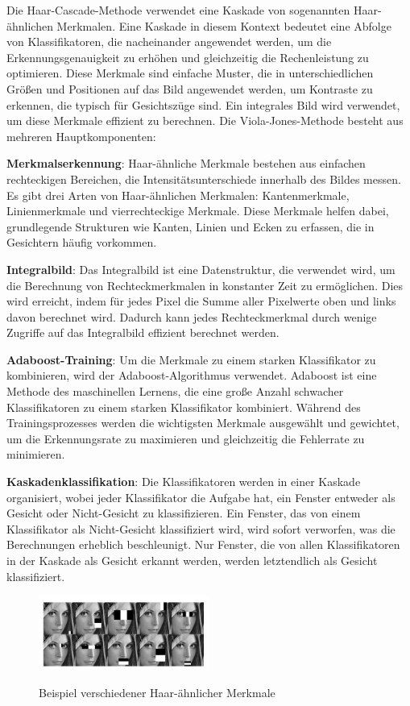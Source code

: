 Die Haar-Cascade-Methode verwendet eine Kaskade von sogenannten Haar-ähnlichen Merkmalen\cite{haar_quelle}. Eine Kaskade in diesem Kontext bedeutet eine Abfolge von Klassifikatoren, die nacheinander angewendet werden, um die Erkennungsgenauigkeit zu erhöhen und gleichzeitig die Rechenleistung zu optimieren. Diese Merkmale sind einfache Muster, die in unterschiedlichen Größen und Positionen auf das Bild angewendet werden, um Kontraste zu erkennen, die typisch für Gesichtszüge sind. Ein integrales Bild wird verwendet, um diese Merkmale effizient zu berechnen. Die Viola-Jones-Methode besteht aus mehreren Hauptkomponenten:

\textbf{Merkmalserkennung}: Haar-ähnliche Merkmale bestehen aus einfachen rechteckigen Bereichen, die Intensitätsunterschiede innerhalb des Bildes messen. Es gibt drei Arten von Haar-ähnlichen Merkmalen: Kantenmerkmale, Linienmerkmale und vierrechteckige Merkmale. Diese Merkmale helfen dabei, grundlegende Strukturen wie Kanten, Linien und Ecken zu erfassen, die in Gesichtern häufig vorkommen.

\textbf{Integralbild}: Das Integralbild ist eine Datenstruktur, die verwendet wird, um die Berechnung von Rechteckmerkmalen in konstanter Zeit zu ermöglichen. Dies wird erreicht, indem für jedes Pixel die Summe aller Pixelwerte oben und links davon berechnet wird. Dadurch kann jedes Rechteckmerkmal durch wenige Zugriffe auf das Integralbild effizient berechnet werden.

\textbf{Adaboost-Training}: Um die Merkmale zu einem starken Klassifikator zu kombinieren, wird der Adaboost-Algorithmus verwendet. Adaboost ist eine Methode des maschinellen Lernens, die eine große Anzahl schwacher Klassifikatoren zu einem starken Klassifikator kombiniert. Während des Trainingsprozesses werden die wichtigsten Merkmale ausgewählt und gewichtet, um die Erkennungsrate zu maximieren und gleichzeitig die Fehlerrate zu minimieren.

\textbf{Kaskadenklassifikation}: Die Klassifikatoren werden in einer Kaskade organisiert, wobei jeder Klassifikator die Aufgabe hat, ein Fenster entweder als Gesicht oder Nicht-Gesicht zu klassifizieren. Ein Fenster, das von einem Klassifikator als Nicht-Gesicht klassifiziert wird, wird sofort verworfen, was die Berechnungen erheblich beschleunigt. Nur Fenster, die von allen Klassifikatoren in der Kaskade als Gesicht erkannt werden, werden letztendlich als Gesicht klassifiziert.\begin{figure}[h!]
    \centering
    \includegraphics[width=0.5\textwidth]{pictures/haarcascades.jpg}
    \caption{Beispiel verschiedener Haar-ähnlicher Merkmale}
    \label{fig:haar_cascade_example}
    \cite{haar_cascade_example}
\end{figure}

